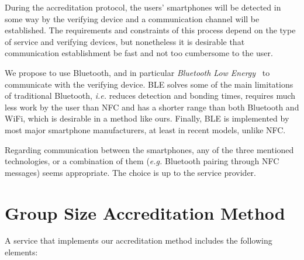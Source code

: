 \documentclass[11pt]{llncs}
\begin{document}
During the accreditation protocol, the users' smartphones
will be detected in some way by the verifying device and a
communication channel will be established. The requirements and
constraints of this process depend on the type of service
and verifying devices, but nonetheless it is desirable that
communication establishment be fast and not too cumbersome to the user.

We propose to use Bluetooth, and in particular
\emph{Bluetooth Low Energy}~\cite{ab.Bluetooth2013}
to communicate with the verifying device.
BLE solves some of the main limitations of traditional Bluetooth, \emph{i.e.}
reduces detection and  bonding times, requires much less work
by the user than NFC and has a shorter range than
both Bluetooth and WiFi, which is desirable in a method
like ours. Finally, BLE is implemented by most major
smartphone manufacturers, at least in recent models,
unlike NFC.

Regarding communication between the smartphones,
any of the three mentioned technologies, or a combination
of them (\emph{e.g.} Bluetooth pairing through NFC messages)
seems appropriate. The choice is up to
the service provider.


\section{Group Size Accreditation Method}\label{ab.sec.system}

A service that implements our accreditation method
includes the following elements:
\end{document}
